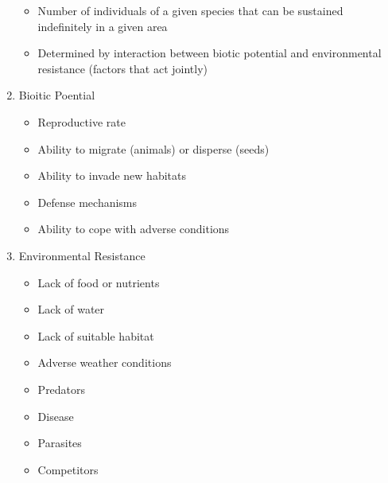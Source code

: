 \documentclass[12pt]{article}
\begin{document}
\begin{enumerate}
    \begin{itemize}

      \item Number of individuals of a given species that can be sustained indefinitely in a given area

      \item Determined by interaction between biotic potential and environmental resistance (factors that act jointly)

    \end{itemize}

  \item Bioitic Poential

    \begin{itemize}

      \item Reproductive rate

      \item Ability to migrate (animals) or disperse (seeds)

      \item Ability to invade new habitats

      \item Defense mechanisms

      \item Ability to cope with adverse conditions

    \end{itemize}

  \item Environmental Resistance

    \begin{itemize}

      \item Lack of food or nutrients

      \item Lack of water

      \item Lack of suitable habitat

      \item Adverse weather conditions

      \item Predators

      \item Disease

      \item Parasites

      \item Competitors


\end{itemize}
\end{enumerate}
\end{document}

